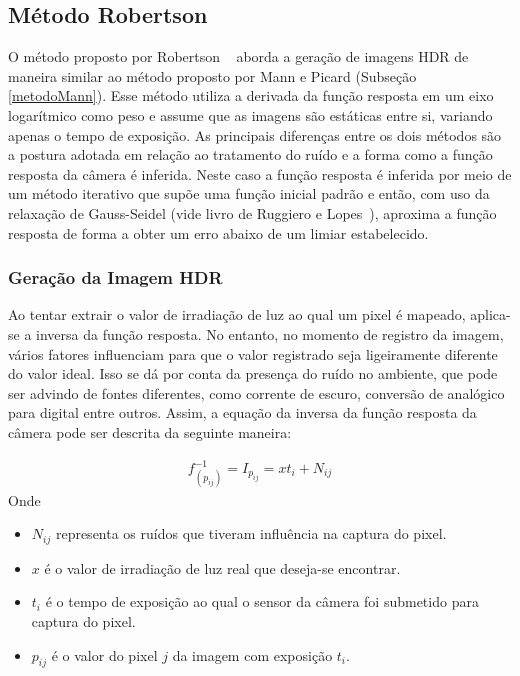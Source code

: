 \subsection{Método Robertson} \label{metodoRobertson}

O método proposto por Robertson \etal~\cite{robertson} aborda a geração de imagens HDR de maneira similar ao método proposto por Mann e Picard (Subseção \ref{metodoMann}). Esse método utiliza a derivada da função resposta em um eixo logarítmico como peso e assume que as imagens são estáticas entre si, variando apenas o tempo de exposição. As principais diferenças entre os dois métodos são a postura adotada em relação ao tratamento do ruído e a forma como a função resposta da câmera é inferida. Neste caso a função resposta é inferida por meio de um método iterativo que supõe uma função inicial padrão e então, com uso da relaxação de Gauss-Seidel (vide livro de Ruggiero e Lopes~\cite{livroCalculoNumerico}), aproxima a função resposta de forma a obter um erro abaixo de um limiar estabelecido.

\subsubsection{Geração da Imagem HDR} \label{metodoRobertsonGeracao}

Ao tentar extrair o valor de irradiação de luz ao qual um pixel é mapeado, aplica-se a inversa da função resposta. No entanto, no momento de registro da imagem, vários fatores influenciam para que o valor registrado seja ligeiramente diferente do valor ideal. Isso se dá por conta da presença do ruído no ambiente, que pode ser advindo de fontes diferentes, como corrente de escuro, conversão de analógico para digital entre outros. Assim, a equação da inversa da função resposta da câmera pode ser descrita da seguinte maneira:

\begin{align} \label{eqRobertsonIFR}
	f_{(p_{ij})}^{-1} = I_{p_{ij}} = xt_{i} + N_{ij}
\end{align}
Onde
\begin{itemize}
\item $N_{ij}$ representa os ruídos que tiveram influência na captura do pixel.
\item $x$ é o valor de irradiação de luz real que deseja-se encontrar.
\item $t_{i}$ é o tempo de exposição ao qual o sensor da câmera foi submetido para captura do pixel.
\item $p_{ij}$ é o valor do pixel $j$ da imagem com exposição $t_{i}$.
\end{itemize}


